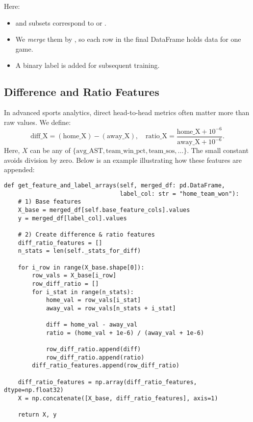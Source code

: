 \documentclass[12pt]{article}
\begin{document}
\noindent
Here:
\begin{itemize}
    \item {} and  subsets correspond to  or .
    \item We \emph{merge} them by , so each row in the final  DataFrame holds data for one game.
    \item A binary label  is added for subsequent training.
\end{itemize}

\subsection{Difference and Ratio Features}
In advanced sports analytics, direct head-to-head metrics often matter more than raw values. We define:
\[
\text{diff\_X} = (\text{home\_X}) - (\text{away\_X}), 
\quad 
\text{ratio\_X} = \frac{\text{home\_X} + 10^{-6}}{\text{away\_X} + 10^{-6}}.
\]
Here, \(X\) can be any of \(\{ \text{avg\_AST}, \text{team\_win\_pct}, \text{team\_sos}, \ldots \}\). The small constant avoids division by zero. Below is an example illustrating how these features are appended:

\begin{verbatim}
def get_feature_and_label_arrays(self, merged_df: pd.DataFrame, 
                                 label_col: str = "home_team_won"):
    # 1) Base features
    X_base = merged_df[self.base_feature_cols].values
    y = merged_df[label_col].values

    # 2) Create difference & ratio features
    diff_ratio_features = []
    n_stats = len(self._stats_for_diff)

    for i_row in range(X_base.shape[0]):
        row_vals = X_base[i_row]
        row_diff_ratio = []
        for i_stat in range(n_stats):
            home_val = row_vals[i_stat]
            away_val = row_vals[n_stats + i_stat]

            diff = home_val - away_val
            ratio = (home_val + 1e-6) / (away_val + 1e-6)

            row_diff_ratio.append(diff)
            row_diff_ratio.append(ratio)
        diff_ratio_features.append(row_diff_ratio)

    diff_ratio_features = np.array(diff_ratio_features, dtype=np.float32)
    X = np.concatenate([X_base, diff_ratio_features], axis=1)

    return X, y
\end{verbatim}
\end{document}
